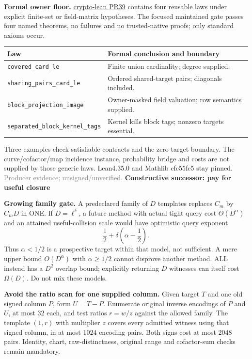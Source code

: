 \documentclass[10pt]{article}
\newcommand{\scope}{\textcolor{gray}{\footnotesize Producer evidence; unsigned/unverified.}}
\begin{document}
\textbf{Formal owner floor.} \href{https://github.com/aburan28/crypto-lean/pull/39}{crypto-lean PR39}
contains four reusable laws under explicit finite-set or field-matrix
hypotheses. The focused maintained gate passes four named theorems, no
failures and no trusted-native proofs; only standard axioms occur.
\begin{center}\small
\begin{tabular}{lp{3.6in}}
\toprule
Law & Formal conclusion and boundary\\\midrule
\texttt{covered\_card\_le} & Finite union cardinality; degree supplied.\\
\texttt{sharing\_pairs\_card\_le} & Ordered shared-target pairs; diagonals included.\\
\texttt{block\_projection\_image} & Owner-masked field valuation; row semantics supplied.\\
\texttt{separated\_block\_kernel\_tags} & Kernel kills block tags; nonzero targets essential.\\\bottomrule
\end{tabular}\end{center}
Three examples check satisfiable contracts and the zero-target boundary.
The curve/cofactor/map incidence instance, probability bridge and costs are
not supplied by those generic laws. Lean4.35.0 and Mathlib cfc55fc5 stay pinned.
\scope
\newpage
{\Large\bf Constructive successor: pay for useful closure}

\textbf{Growing family gate.} A predeclared family of $D$ templates replaces
$C_m$ by $C_mD$ in ONE. If $D=\ell^\delta$, a future method with actual tight
query cost $\Theta(D^\alpha)$ and an attained useful-collision scale would
have optimistic query exponent
\[
 \frac12+\delta\left(\alpha-\frac12\right).
\]
Thus $\alpha<1/2$ is a prospective target within that model, not sufficient.
A mere upper bound $O(D^\alpha)$ with $\alpha\ge1/2$ cannot disprove another
method. ALL instead has a $D^2$ overlap bound; explicitly returning $D$
witnesses can itself cost $\Omega(D)$. Do not mix these models.

\textbf{Avoid the ratio scan for one supplied column.} Given target $T$ and
one old signed column $P$, form $U=T-P$. Enumerate original inverse
encodings of $P$ and $U$, at most $32$ each, and test ratios $r=w/z$ against
the allowed family. The template $(1,r)$ with multiplier $z$ covers every
admitted witness using that signed column, in at most $1024$ encoding pairs.
Both signs cost at most $2048$ pairs. Identity, chart, raw-distinctness,
original range and cofactor-sum checks remain mandatory.
\end{document}
